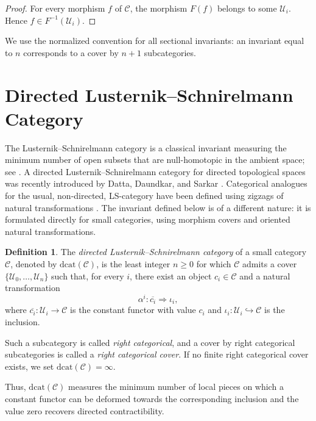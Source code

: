 \documentclass[12pt]{amsart}
\theoremstyle{definition}
\newtheorem{definition}[teo]{Definition}
\theoremstyle{remark}
\numberwithin{figure}{section}%
\newcommand{\CC}{\mathcal{C}}
\newcommand{\Uc}{\mathcal{U}}
\begin{document}
\begin{proof}
For every morphism \(f\) of \(\CC\), the morphism \(F(f)\) belongs to some
\(\Uc_i\). Hence \(f\in F^{-1}(\Uc_i)\).
\end{proof}

We use the normalized convention for all sectional invariants: an invariant
equal to \(n\) corresponds to a cover by \(n+1\) subcategories.
\section{Directed Lusternik--Schnirelmann Category}
\label{sec:directed_LS_category}

The Lusternik--Schnirelmann category is a classical invariant measuring the
minimum number of open subsets that are null-homotopic in the ambient
space; see \cite{LS-CAT-OPREA}. A directed Lusternik--Schnirelmann category for directed topological spaces
was recently introduced by Datta, Daundkar, and Sarkar
\cite{DattaDaundkarSarkar}. Categorical analogues for the usual, non-directed, LS-category have been defined
using zigzags of natural transformations
\cite{LS-Tanaka,carcaciacampos2026weakstrongfibrationsfunctors}. The invariant defined below is of a different
nature: it is formulated directly for small categories, using morphism
covers and oriented natural transformations.

\begin{definition}\label{def:directed_LS_category}
The \emph{directed Lusternik--Schnirelmann category} of a small category
\(\CC\), denoted by \(\mathrm{dcat}(\CC)\), is the least integer \(n\geq0\)
for which \(\CC\) admits a cover
\(\{\Uc_0,\ldots,\Uc_n\}\) such that, for every \(i\), there exist an
object \(c_i\in\CC\) and a natural transformation
\[
\alpha^i\colon\overline{c_i}\Rightarrow\iota_i,
\]
where \(\overline{c_i}\colon\Uc_i\to\CC\) is the constant functor with
value \(c_i\) and \(\iota_i\colon\Uc_i\hookrightarrow\CC\) is the
inclusion.

Such a subcategory is called \emph{right categorical}, and a cover by right
categorical subcategories is called a \emph{right categorical cover}. If
no finite right categorical cover exists, we set
\(\mathrm{dcat}(\CC)=\infty\).
\end{definition}

Thus, \(\mathrm{dcat}(\CC)\) measures the minimum number of local pieces on
which a constant functor can be deformed towards the corresponding
inclusion and the value zero recovers directed contractibility.
\end{document}
